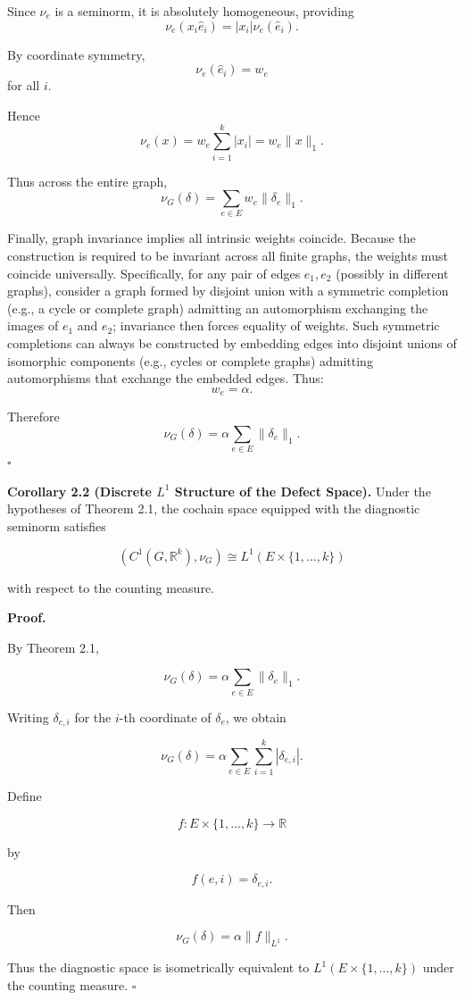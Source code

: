 \documentclass[
]{article}
\begin{document}
Since \(\nu_e\) is a seminorm, it is absolutely homogeneous, providing
\[ \nu_e(x_i \hat{e}_i)=|x_i|\nu_e(\hat{e}_i). \]

By coordinate symmetry, \[ \nu_e(\hat{e}_i)=w_e \] for all \(i\).

Hence \[ \nu_e(x)=w_e\sum_{i=1}^k |x_i|=w_e\|x\|_1. \]

Thus across the entire graph,
\[ \nu_G(\delta)=\sum_{e\in E} w_e\|\delta_e\|_1. \]

Finally, graph invariance implies all intrinsic weights coincide.
Because the construction is required to be invariant across all finite
graphs, the weights must coincide universally. Specifically, for any
pair of edges \(e_1, e_2\) (possibly in different graphs), consider a
graph formed by disjoint union with a symmetric completion (e.g., a
cycle or complete graph) admitting an automorphism exchanging the images
of \(e_1\) and \(e_2\); invariance then forces equality of weights. Such
symmetric completions can always be constructed by embedding edges into
disjoint unions of isomorphic components (e.g., cycles or complete
graphs) admitting automorphisms that exchange the embedded edges. Thus:
\[ w_e=\alpha. \]

Therefore \[ \nu_G(\delta)=\alpha\sum_{e\in E}\|\delta_e\|_1. \]
\(\square\)

\textbf{Corollary 2.2 (Discrete \(L^1\) Structure of the Defect Space).}
Under the hypotheses of Theorem 2.1, the cochain space equipped with the
diagnostic seminorm satisfies

\[
(C^1(G,\mathbb{R}^k),\nu_G)
\cong
L^1(E\times\{1,\dots,k\})
\]

with respect to the counting measure.

\textbf{Proof.}

By Theorem 2.1,

\[
\nu_G(\delta)
=
\alpha\sum_{e\in E}\|\delta_e\|_1.
\]

Writing \(\delta_{e,i}\) for the \(i\)-th coordinate of \(\delta_e\), we
obtain

\[
\nu_G(\delta)
=
\alpha\sum_{e\in E}\sum_{i=1}^k |\delta_{e,i}|.
\]

Define

\[
f:E\times\{1,\dots,k\}\to\mathbb{R}
\]

by

\[
f(e,i)=\delta_{e,i}.
\]

Then

\[
\nu_G(\delta)
=
\alpha\|f\|_{L^1}.
\]

Thus the diagnostic space is isometrically equivalent to
\(L^1(E\times\{1,\dots,k\})\) under the counting measure. \(\square\)
\end{document}
